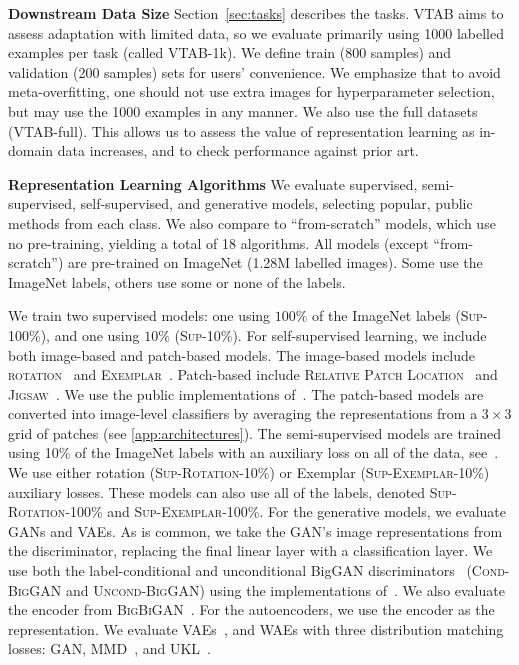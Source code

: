 \documentclass{article}
\newcommand{\myparagraph}[1]{\noindent\textbf{#1}\quad}
\newcommand{\imagenet}{ImageNet}
\begin{document}
\myparagraph{Downstream Data Size}
Section~\ref{sec:tasks} describes the tasks.
VTAB aims to assess adaptation with limited data, so we evaluate primarily using \num{1000} labelled examples per task (called VTAB-1k).
We define train (\num{800} samples) and validation (\num{200} samples) sets for users' convenience.
We emphasize that to avoid meta-overfitting, one should not use extra images for hyperparameter selection, but may use the \num{1000} examples in any manner.
We also use the full datasets (VTAB-full).
This allows us to assess the value of representation learning as in-domain data increases, and to check performance against prior art.

\myparagraph{Representation Learning Algorithms}
We evaluate supervised, semi-supervised, self-supervised, and generative models, selecting popular, public methods from each class.
We also compare to ``from-scratch'' models, which use no pre-training, yielding a total of 18 algorithms.
All models (except ``from-scratch'') are pre-trained on \imagenet{} (1.28M labelled images).
Some use the \imagenet{} labels, others use some or none of the labels.

We train two supervised models: one using $100\%$ of the \imagenet{} labels (\textsc{Sup-100\%}), and one using $10\%$ (\textsc{Sup-10\%}).
For self-supervised learning, we include both image-based and patch-based models.
The image-based models include \textsc{rotation}~\citep{gidaris2018unsupervised} and \textsc{Exemplar}~\citep{dosovitskiy2014exemplar}.
Patch-based include
\textsc{Relative Patch Location}~\citep{doersch2015unsupervised} and \textsc{Jigsaw}~\citep{noroozi2016unsupervised}.
We use the public implementations of~\citet{kolesnikov2019revisiting}.
The patch-based models are converted into image-level classifiers by averaging the representations from a $3\times3$ grid of patches (see \cref{app:architectures}).
The semi-supervised models are trained using 10\% of the \imagenet{} labels with an auxiliary loss on all of the data, see~\citep{zhai2019s4l}.
We use either rotation (\textsc{Sup-Rotation-10\%}) or Exemplar (\textsc{Sup-Exemplar-10\%}) auxiliary losses.
These models can also use all of the labels, denoted \textsc{Sup-Rotation-100\%} and \textsc{Sup-Exemplar-100\%}.
For the generative models, we evaluate GANs and VAEs.
As is common, we take the GAN's image representations from the discriminator, replacing the final linear layer with a classification layer.
We use both the label-conditional and unconditional BigGAN discriminators~\citep{brock2018large} (\textsc{Cond-BigGAN} and \textsc{Uncond-BigGAN}) using the implementations of~\citet{chen2019self,lucic2019high}.
We also evaluate the encoder from \textsc{BigBiGAN}~\citep{donahue2019large}.
For the autoencoders, we use the encoder as the representation.
We evaluate VAEs~\citep{kingma2013auto}, and WAEs with three distribution matching losses: GAN, MMD~\citep{tolstikhin2017wasserstein}, and UKL~\citep{rubenstein2019practical}.
\end{document}
